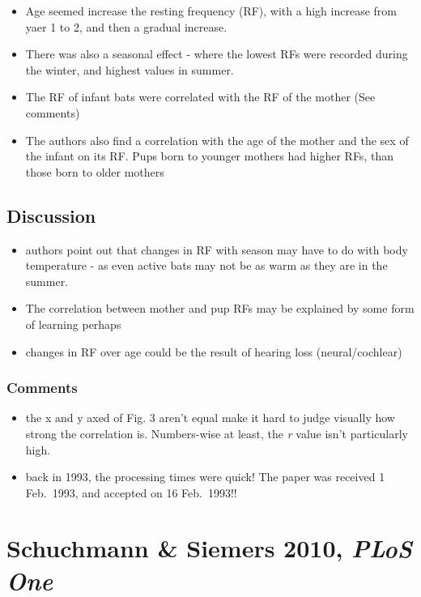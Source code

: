 \documentclass[
]{book}
\providecommand{\tightlist}{%
  \setlength{\itemsep}{0pt}\setlength{\parskip}{0pt}}
\begin{document}
\begin{itemize}
\tightlist
\item
  Age seemed increase the resting frequency (RF), with a high increase from yaer 1 to 2, and then a gradual increase.
\item
  There was also a seasonal effect - where the lowest RFs were recorded during the winter, and highest values in summer.
\item
  The RF of infant bats were correlated with the RF of the mother (See comments)
\item
  The authors also find a correlation with the age of the mother and the sex of the infant on its RF. Pups born to younger mothers had higher RFs, than those born to older mothers
\end{itemize}

\hypertarget{discussion-1}{%
\section{Discussion}\label{discussion-1}}

\begin{itemize}
\tightlist
\item
  authors point out that changes in RF with season may have to do with body temperature - as even active bats may not be as warm as they are in the summer.
\item
  The correlation between mother and pup RFs may be explained by some form of learning perhaps
\item
  changes in RF over age could be the result of hearing loss (neural/cochlear)
\end{itemize}

\hypertarget{comments-4}{%
\subsection{Comments}\label{comments-4}}

\begin{itemize}
\tightlist
\item
  the x and y axed of Fig. 3 aren't equal make it hard to judge visually how strong the correlation is. Numbers-wise at least, the \emph{r} value isn't particularly high.
\item
  back in 1993, the processing times were quick! The paper was received 1 Feb.~1993, and accepted on 16 Feb.~1993!!
\end{itemize}

\hypertarget{schuchmann-siemers-2010-plos-one}{%
\chapter{\texorpdfstring{Schuchmann \& Siemers 2010, \emph{PLoS One}}{Schuchmann \& Siemers 2010, PLoS One}}\label{schuchmann-siemers-2010-plos-one}}
\end{document}
